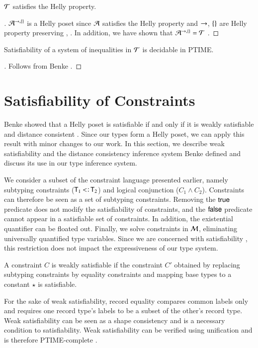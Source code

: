 \documentclass{report}
\begin{document}
  \begin{cor}
    $\mathcal{T}$ satisfies the Helly property.
  \end{cor}
  \begin{proof}[]
    $\mathcal{A}^{\rightarrow,{\{\}}}$ is a Helly poset since $\mathcal{A}$ satisfies the Helly property 
    and $\rightarrow$, ${\{\}}$ are Helly property preserving , .
    In addition, we have shown that $\mathcal{A}^{\rightarrow,{\{\}}}=\mathcal{T}$ .
  \end{proof}
  \begin{cor}
    Satisfiability of a system of inequalities in $\mathcal{T}$ is decidable in PTIME.
  \end{cor}
  \begin{proof}[]
    Follows from Benke \cite{benke93}.
  \end{proof}
  
  \section{Satisfiability of Constraints}
  Benke \cite{benke93} showed that a Helly poset is satisfiable if and only if
  it is weakly satisfiable  and distance consistent .
  Since our types form a Helly poset, we can apply this result with minor changes to our work.
  In this section, we describe weak satisfiability and
  the distance consistency inference system Benke \cite{benke93}
  defined and discuss its use in our type inference system.
  
  We consider a subset of the constraint language presented earlier, namely subtyping constraints
  ($\type{T}_1\subtype\type{T}_2$) and logical conjunction ($C_1\land C_2$). Constraints can therefore
  be seen as a set of subtyping constraints. Removing the
  $\textsf{true}$ predicate does not modify the satisfiability
  of constraints, and the $\textsf{false}$ predicate cannot appear in a satisfiable set of constraints.
  In addition, the existential quantifier can be floated out.
  Finally, we solve constraints in $\mathcal{M}$, eliminating universally quantified type variables.
  Since we are concerned with satisfiability , this restriction does not impact
  the expressiveness of our type system.
  
  \begin{dfn}
    A constraint $C$ is weakly satisfiable if the constraint $C'$ obtained by replacing
    subtyping constraints by equality constraints and mapping base types to a constant $\star$
    is satisfiable.
  \end{dfn}
  For the sake of weak satisfiability, record equality compares common labels only and requires
  one record type's labels to be a subset of the other's record type.
  Weak satisfiability can be seen as a shape consistency and is a necessary condition to
  satisfiability. Weak satisfiability can be verified using unification and is
  therefore PTIME-complete \cite{linearunification, efficientunification}.
  
\end{document}
